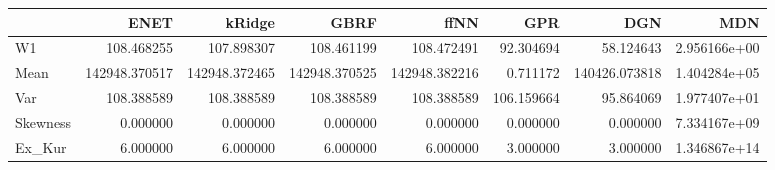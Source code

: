 \begin{tabular}{lrrrrrrr}
\toprule
{} &           ENET &         kRidge &           GBRF &           ffNN &         GPR &            DGN &           MDN \\
\midrule
W1       &     108.468255 &     107.898307 &     108.461199 &     108.472491 &   92.304694 &      58.124643 &  2.956166e+00 \\
Mean     &  142948.370517 &  142948.372465 &  142948.370525 &  142948.382216 &    0.711172 &  140426.073818 &  1.404284e+05 \\
Var      &     108.388589 &     108.388589 &     108.388589 &     108.388589 &  106.159664 &      95.864069 &  1.977407e+01 \\
Skewness &       0.000000 &       0.000000 &       0.000000 &       0.000000 &    0.000000 &       0.000000 &  7.334167e+09 \\
Ex\_Kur   &       6.000000 &       6.000000 &       6.000000 &       6.000000 &    3.000000 &       3.000000 &  1.346867e+14 \\
\bottomrule
\end{tabular}
